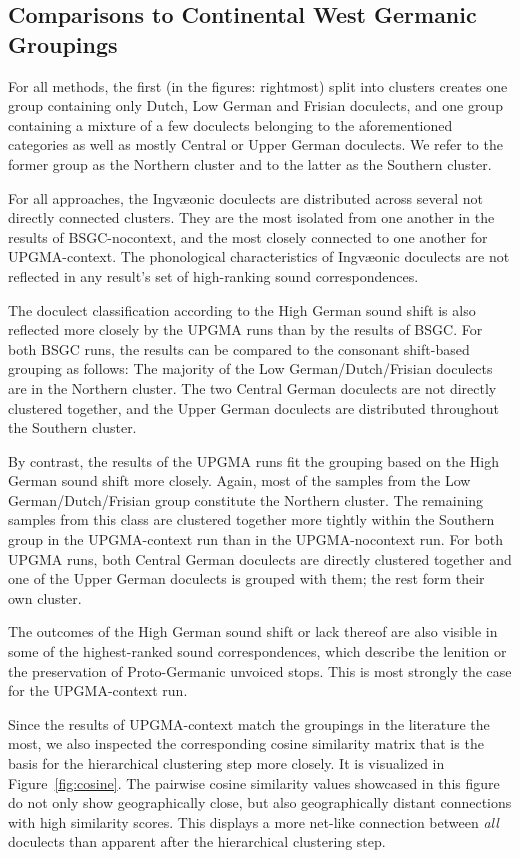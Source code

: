 \documentclass[a4paper, 11pt]{article}
\begin{document}
\subsection{Comparisons to Continental West Germanic Groupings}

For all methods, the first (in the figures: rightmost) split into clusters
creates one group containing only Dutch, Low German and Frisian doculects,
and one group containing a mixture of 
a few doculects belonging to the aforementioned categories as well as
mostly Central or Upper German doculects.
We refer to the former group as the Northern cluster and to the
latter as the Southern cluster.

For all approaches, the Ingv\ae{}onic doculects
are distributed across several not directly connected clusters.
They are the most isolated from one another in the results of BSGC-nocontext, and the most closely connected to one another for UPGMA-context.
The phonological characteristics of Ingv\ae{}onic doculects
are not reflected in any result's set of high-ranking sound correspondences.

The doculect classification according to the High German sound shift is also reflected more closely by the UPGMA runs than by the results of BSGC. 
For both BSGC runs, the results can be compared to the consonant shift-based grouping as follows:
The majority of the Low German/Dutch/Frisian doculects are in
the Northern cluster.
The two Central German doculects are not directly clustered together,
and the Upper German doculects are distributed throughout the Southern cluster.

By contrast, the results of the UPGMA runs fit
the grouping based on the High German sound shift more closely.
Again, most of the samples from the Low German/Dutch/Frisian group
constitute the Northern cluster.
The remaining samples from this class are clustered together
more tightly within the Southern group in the UPGMA-context run than in the UPGMA-nocontext run.
For both UPGMA runs, both Central German doculects are directly clustered together and one of the Upper German doculects is grouped with them; 
the rest form their own cluster.

The outcomes of the High German sound shift or lack thereof
are also visible in some of the highest-ranked sound correspondences,
which describe the lenition or the preservation of Proto-Germanic unvoiced stops.
This is most strongly the case for the UPGMA-context run.

Since the results of UPGMA-context match the
groupings in the literature the most, 
we also inspected the 
corresponding
cosine similarity matrix that is the basis for the
hierarchical clustering step more closely.
It is visualized in Figure~\ref{fig:cosine}.
The pairwise cosine similarity values showcased in this figure
do not only show geographically close, but also geographically distant connections with high similarity scores.
This displays a more net-like connection between \textit{all} doculects than
apparent after the hierarchical clustering step.
\end{document}
